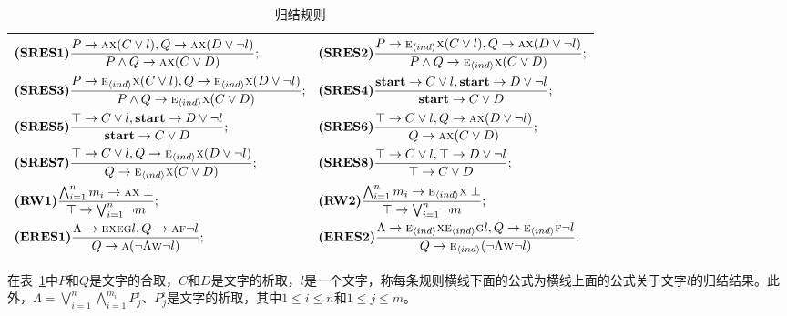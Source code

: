 \begin{table}[tb]%
	\small
	\centering
	\caption{归结规则}\label{tab:res}
	\begin{tabular}{l}
		\toprule
		$
		\begin{aligned}
			& \textbf{(SRES1)}\frac{P\rightarrow \textsc{a}\textsc{x}(C\vee l), Q\rightarrow \textsc{a}\textsc{x}(D\vee \neg l)}{P\wedge Q \rightarrow \textsc{a}\textsc{x}(C\vee D)};
			&& \textbf{(SRES2)} \frac{P\rightarrow \textsc{e}_{{\langle{ind}\rangle}} \textsc{x}(C\vee l), Q\rightarrow \textsc{a}\textsc{x}(D\vee \neg l)}{P\wedge Q \rightarrow \textsc{e}_{{\langle{ind}\rangle}}\textsc{x}(C\vee D)};\\
			& \textbf{(SRES3)} \frac{P\rightarrow \textsc{e}_{{\langle{ind}\rangle}}\textsc{x}(C\vee l), Q \rightarrow \textsc{e}_{{\langle{ind}\rangle}}\textsc{x}(D\vee \neg l)}{P\wedge Q\rightarrow\textsc{e}_{{\langle{ind}\rangle}}\textsc{x}(C\vee D)};  
			&&   \textbf{(SRES4)} \frac{\textbf{start} \rightarrow C\vee l, \textbf{start} \rightarrow D \vee \neg l}{\textbf{start} \rightarrow C\vee D}; \\
			& \textbf{(SRES5)} \frac{\top \rightarrow C\vee l, \textbf{start} \rightarrow D \vee \neg l}{\textbf{start} \rightarrow C \vee D};
			&&  \textbf{(SRES6)} \frac{\top \rightarrow C \vee l, Q \rightarrow \textsc{a}\textsc{x}(D \vee \neg l)}{Q\rightarrow \textsc{a} \textsc{x}(C\vee D)}; \\
			& \textbf{(SRES7)} \frac{\top \rightarrow C \vee l, Q \rightarrow \textsc{e}_{{\langle{ind}\rangle}} \textsc{x}(D \vee \neg l)}{Q\rightarrow \textsc{e}_{{\langle{ind}\rangle}}\textsc{x}(C\vee D)}; 
			&&  \textbf{(SRES8)} \frac{\top \rightarrow C\vee l, \top \rightarrow D \vee \neg l}{\top \rightarrow C \vee D};\\
			& \textbf{(RW1)} \frac{\bigwedge_{i=1}^n m_i \rightarrow \textsc{a}\textsc{x} \perp}{\top \rightarrow \bigvee_{i=1}^n \neg m}; 
			&& \textbf{(RW2)} \frac{\bigwedge_{i=1}^n m_i \rightarrow \textsc{e}_{{\langle{ind}\rangle}}\textsc{x} \perp}{\top \rightarrow \bigvee_{i=1}^n \neg m}; \\
			& \textbf{(ERES1)} \frac{\Lambda \rightarrow \textsc{e} \textsc{x} \textsc{e}\textsc{g} l, Q \rightarrow \textsc{a} \textsc{f} \neg l}{Q \rightarrow \textsc{a}(\neg \Lambda \textsc{w} \neg l)};
			&& \textbf{(ERES2)} \frac{\Lambda \rightarrow \textsc{e}_{{\langle{ind}\rangle}} \textsc{x} \textsc{e}_{{\langle{ind}\rangle}}\textsc{g} l, Q \rightarrow \textsc{e}_{{\langle{ind}\rangle}} \textsc{f} \neg l}{Q \rightarrow \textsc{e}_{{\langle{ind}\rangle}}(\neg \Lambda \textsc{w} \neg l)}.
		\end{aligned}
		$\\
		\bottomrule
	\end{tabular}
\end{table}
在表~\ref{tab:res}中$P$和$Q$是文字的合取，$C$和$D$是文字的析取，$l$是一个文字，称每条规则横线下面的公式为横线上面的公式关于文字$l$的归结结果。此外，$\Lambda=\bigvee_{i=1}^n \bigwedge_{i=1}^{m_i}P_j^i$、$P_j^i$是文字的析取，其中$1\leq i\leq n$和$1\leq j\leq m$。

